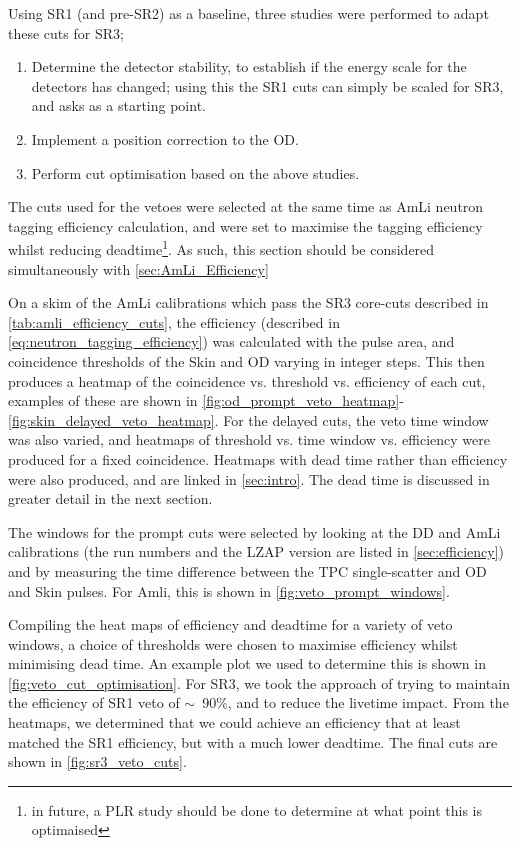 Using SR1 (and pre-SR2) as a baseline, three studies were performed to adapt these cuts for SR3;
\begin{enumerate}
    \item Determine the detector stability, to establish if the energy scale for the detectors has changed; using this the SR1 cuts can simply be scaled for SR3, and asks as a starting point.
    \item Implement a position correction to the OD.
    \item Perform cut optimisation based on the above studies.
\end{enumerate}

The cuts used for the vetoes were selected at the same time as AmLi neutron tagging efficiency calculation, and were set to maximise the tagging efficiency whilst reducing deadtime\footnote{in future, a PLR study should be done to determine at what point this is optimaised}.
As such, this section should be considered simultaneously with \autoref{sec:AmLi_Efficiency}

On a skim of the AmLi calibrations which pass the SR3 core-cuts described in \autoref{tab:amli_efficiency_cuts}, the efficiency (described in \autoref{eq:neutron_tagging_efficiency}) was calculated with the pulse area, and coincidence thresholds of the Skin and OD varying in integer steps.
This then produces a heatmap of the coincidence vs. threshold vs. efficiency of each cut, examples of these are shown in \autoref{fig:od_prompt_veto_heatmap}-\ref{fig:skin_delayed_veto_heatmap}. 
For the delayed cuts, the veto time window was also varied, and heatmaps of threshold vs. time window vs. efficiency were produced for a fixed coincidence.
Heatmaps with dead time rather than efficiency were also produced, and are linked in \autoref{sec:intro}.
The dead time is discussed in greater detail in the next section. 

The windows for the prompt cuts were selected by looking at the DD and AmLi calibrations (the run numbers and the LZAP version are listed in \autoref{sec:efficiency}) and by measuring the time difference between the TPC single-scatter and OD and Skin pulses.
For Amli, this is shown in \autoref{fig:veto_prompt_windows}.

Compiling the heat maps of efficiency and deadtime for a variety of veto windows, a choice of thresholds were chosen to maximise efficiency whilst minimising dead time.
An example plot we used to determine this is shown in \autoref{fig:veto_cut_optimisation}.
For SR3, we took the approach of trying to maintain the efficiency of SR1 veto of $\sim$~90\%, and to reduce the livetime impact.
From the heatmaps, we determined that we could achieve an efficiency that at least matched the SR1 efficiency, but with a much lower deadtime.
The final cuts are shown in \autoref{fig:sr3_veto_cuts}.



